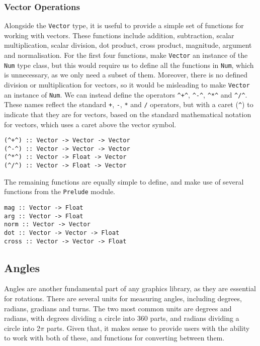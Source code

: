 \documentclass[../main.tex]{subfiles}
\begin{document}
            \subsubsection{Vector Operations}
                Alongside the \texttt{Vector} type, it is useful to provide a simple set of
                    functions for working with vectors.
                These functions include addition, subtraction, scalar multiplication, scalar
                    division, dot product, cross product, magnitude, argument and normalisation.
                For the first four functions, make \texttt{Vector} an instance of the
                    \texttt{Num} type class, but this would require us to define all the functions
                    in \texttt{Num}, which is unnecessary, as we only need a subset of them.
                Moreover, there is no defined division or multiplication for vectors, so it
                    would be misleading to make \texttt{Vector} an instance of \texttt{Num}.
                We can instead define the operators \verb|^+^|, \verb|^-^|, \verb|^*^| and
                    \verb|^/^|.
                These names reflect the standard \verb|+|, \verb|-|, \verb|*| and \verb|/|
                    operators, but with a caret (\verb|^|) to indicate that they are for vectors,
                    based on the standard mathematical notation for vectors, which uses a caret
                    above the vector symbol.

                \begin{lstlisting}[label={lst:vectorOps}, caption={The vector operators.}]
(^+^) :: Vector -> Vector -> Vector
(^-^) :: Vector -> Vector -> Vector
(^*^) :: Vector -> Float -> Vector
(^/^) :: Vector -> Float -> Vector\end{lstlisting}

                The remaining functions are equally simple to define, and make use of several
                    functions from the \texttt{Prelude} module.

                \begin{lstlisting}[label={lst:vectorFns}, caption={The remaining vector functions.}]
mag :: Vector -> Float
arg :: Vector -> Float
norm :: Vector -> Vector
dot :: Vector -> Vector -> Float
cross :: Vector -> Vector -> Float\end{lstlisting}

        \subsection{Angles}
            Angles are another fundamental part of any graphics library, as they are
                essential for rotations.
            There are several units for measuring angles, including degrees, radians,
                gradians and turns.
            The two most common units are degrees and radians, with degrees dividing a
                circle into 360 parts, and radians dividing a circle into $2\pi$ parts.
            Given that, it makes sense to provide users with the ability to work with both
                of these, and functions for converting between them.
\end{document}
